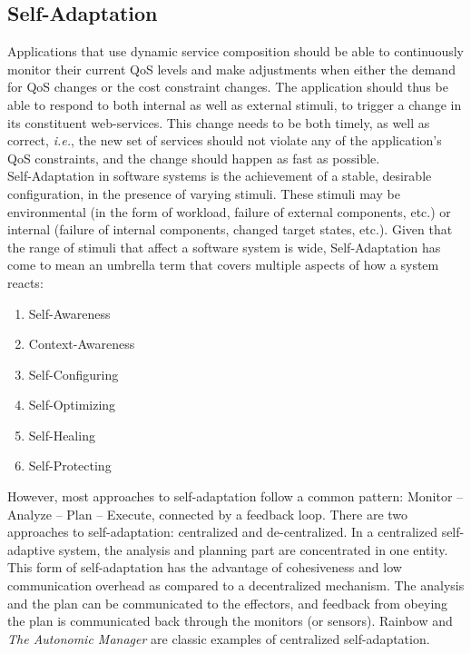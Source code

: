 \documentclass[10pt,journal,compsoc]{IEEEtran}
\begin{document}
\subsection{Self-Adaptation}
Applications that use dynamic service composition should be able to continuously monitor their current QoS levels and make adjustments when either the demand for QoS changes or the cost constraint changes. The application should thus be able to respond to both internal as well as external stimuli, to trigger a change in its constituent web-services. This change needs to be both timely, as well as correct, \textit{i.e.}, the new set of services should not violate any of the application's QoS constraints, and the change should happen as fast as possible.\\
Self-Adaptation in software systems is the achievement of a stable, desirable configuration, in the presence of varying stimuli. These stimuli may be environmental (in the form of workload, failure of external components, etc.) or internal (failure of internal components, changed target states, etc.). Given that the range of stimuli that affect a software system is wide, Self-Adaptation has come to mean an umbrella term that covers multiple aspects of how a system reacts\cite{Salehie2009Self-adaptive}:
	\begin{enumerate}
	   \item Self-Awareness
	\item Context-Awareness
	\item Self-Configuring
	\item Self-Optimizing
	\item Self-Healing
	\item Self-Protecting 
	\end{enumerate}
However, most approaches to self-adaptation follow a common pattern: Monitor -- Analyze -- Plan -- Execute, connected by a feedback loop. There are two approaches to self-adaptation: centralized and de-centralized.  
In a centralized self-adaptive system, the analysis and planning part are concentrated in one entity. This form of self-adaptation has the advantage of cohesiveness and low communication overhead as compared to a decentralized mechanism. The analysis and the plan can be communicated to the effectors, and feedback from obeying the plan is communicated back through the monitors (or sensors). Rainbow\cite{Cheng2006Architecture-based} and \textit{The Autonomic Manager}\cite{IBM2006Architectural} are classic examples of centralized self-adaptation.\\
\end{document}
